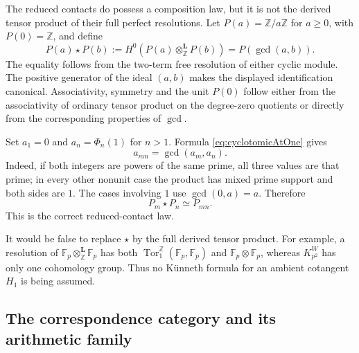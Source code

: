 \documentclass[11pt]{amsart}
\theoremstyle{definition}
\theoremstyle{remark}
\newcommand{\Z}{\mathbb Z}
\begin{document}
The reduced contacts do possess a composition law, but it is not the
derived tensor product of their full perfect resolutions.  Let
$P(a)=\Z/a\Z$ for $a\geq0$, with $P(0)=\Z$, and define
\begin{equation}\label{eq:reducedContactProduct}
 P(a)\star P(b):=
 H^0\!\left(P(a)\mathbin{\otimes_\Z^{\mathbf L}}P(b)\right)
 =P(\gcd(a,b)).
\end{equation}
The equality follows from the two-term free resolution of either cyclic
module.  The positive generator of the ideal $(a,b)$ makes the displayed
identification canonical.  Associativity, symmetry and the unit $P(0)$
follow either from the associativity of ordinary tensor product on the
degree-zero quotients or directly from the corresponding properties of
$\gcd$.

Set $a_1=0$ and $a_n=\Phi_n(1)$ for $n>1$.  Formula
\eqref{eq:cyclotomicAtOne} gives
\begin{equation}\label{eq:cyclotomicGcdLaw}
 a_{mn}=\gcd(a_m,a_n).
\end{equation}
Indeed, if both integers are powers of the same prime, all three values are
that prime; in every other nonunit case the product has mixed prime support
and both sides are $1$.  The cases involving $1$ use $\gcd(0,a)=a$.
Therefore
\begin{equation}\label{eq:contactComposition}
 P_m\star P_n\simeq P_{mn}.
\end{equation}
This is the correct reduced-contact law.

It would be false to replace $\star$ by the full derived tensor product.
For example, a resolution of $\mathbb F_p\otimes_\Z^{\mathbf L}\mathbb
F_p$ has both $\operatorname{Tor}_1^\Z(\mathbb F_p,\mathbb F_p)$ and
$\mathbb F_p\otimes\mathbb F_p$, whereas $K_{p^2}^W$ has only one
cohomology group.  Thus no K\"unneth formula for an ambient cotangent
$H_1$ is being assumed.

\subsection{The correspondence category and its arithmetic family}
\end{document}
